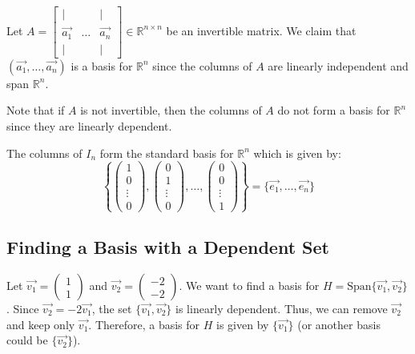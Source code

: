 \begin{eg}
    Let $A = \begin{bmatrix}
        | & & | \\
        \vec{a_1} & \ldots & \vec{a_n} \\
        | & & |
    \end{bmatrix} \in \mathbb{R}^{n \times n}$ be an invertible matrix. We claim that $(\vec{a_1}, \ldots, \vec{a_n})$ is a basis for $\mathbb{R}^n$ since the columns of $A$ are linearly independent and span $\mathbb{R}^n$.
\end{eg}
Note that if $A$ is not invertible, then the columns of $A$ do not form a basis for $\mathbb{R}^n$ since they are linearly dependent.
\begin{eg}
    The columns of $I_n$ form the standard basis for $\mathbb{R}^n$ which is given by:
    \[ \left\{ \begin{pmatrix}
        1 \\ 0 \\ \vdots \\ 0
    \end{pmatrix}, \begin{pmatrix}
        0 \\ 1 \\ \vdots \\ 0
    \end{pmatrix}, \ldots, \begin{pmatrix}
        0 \\ 0 \\ \vdots \\ 1
    \end{pmatrix} \right\} = \{ \vec{e_1}, \ldots, \vec{e_n} \} \]
\end{eg}

\subsection{Finding a Basis with a Dependent Set}
\begin{eg}
    Let $\vec{v_1} = \begin{pmatrix}
        1 \\ 1
    \end{pmatrix}$ and $\vec{v_2} = \begin{pmatrix}
        -2 \\ -2
    \end{pmatrix}$. We want to find a basis for $H = \text{Span}\{\vec{v_1}, \vec{v_2}\}$. Since $\vec{v_2} = -2\vec{v_1}$, the set $\{\vec{v_1}, \vec{v_2}\}$ is linearly dependent. Thus, we can remove $\vec{v_2}$ and keep only $\vec{v_1}$. Therefore, a basis for $H$ is given by $\{\vec{v_1}\}$ (or another basis could be $\{\vec{v_2}\}$).
\end{eg}

